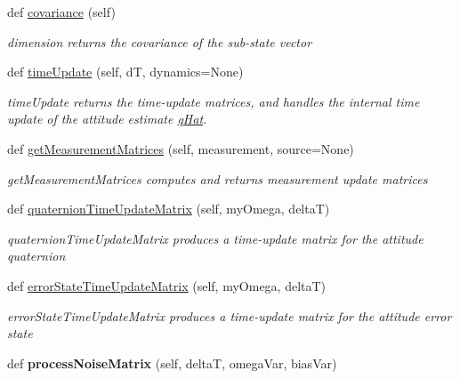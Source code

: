 \begin{DoxyCompactItemize}
def \hyperlink{classAttitudeSubstate_1_1AttitudeState6DOF_a44691ece9ee2a36d3c11f12e72004e41}{covariance} (self)
\begin{DoxyCompactList}\small\item\em dimension returns the covariance of the sub-\/state vector \end{DoxyCompactList}\item 
def \hyperlink{classAttitudeSubstate_1_1AttitudeState6DOF_a9b27c2b6d9e51256918edd8505df0bd7}{time\+Update} (self, dT, dynamics=None)
\begin{DoxyCompactList}\small\item\em time\+Update returns the time-\/update matrices, and handles the internal time update of the attitude estimate \hyperlink{classAttitudeSubstate_1_1AttitudeState6DOF_a36a58a47280151dd544762d9a1d5c35d}{q\+Hat}. \end{DoxyCompactList}\item 
def \hyperlink{classAttitudeSubstate_1_1AttitudeState6DOF_a81f4c417a0f6f0ecf0478fc885bbd79f}{get\+Measurement\+Matrices} (self, measurement, source=None)
\begin{DoxyCompactList}\small\item\em get\+Measurement\+Matrices computes and returns measurement update matrices \end{DoxyCompactList}\item 
def \hyperlink{classAttitudeSubstate_1_1AttitudeState6DOF_aada43a81dfe3ae7b1a22dd24220062e8}{quaternion\+Time\+Update\+Matrix} (self, my\+Omega, deltaT)
\begin{DoxyCompactList}\small\item\em quaternion\+Time\+Update\+Matrix produces a time-\/update matrix for the attitude quaternion \end{DoxyCompactList}\item 
def \hyperlink{classAttitudeSubstate_1_1AttitudeState6DOF_a98463a04f2b7f78389d7cce944139afd}{error\+State\+Time\+Update\+Matrix} (self, my\+Omega, deltaT)
\begin{DoxyCompactList}\small\item\em error\+State\+Time\+Update\+Matrix produces a time-\/update matrix for the attitude error state \end{DoxyCompactList}\item 
def {\bfseries process\+Noise\+Matrix} (self, deltaT, omega\+Var, bias\+Var)\hypertarget{classAttitudeSubstate_1_1AttitudeState6DOF_abc5b2c8345bcd948d35b438fce184dee}{}\label{classAttitudeSubstate_1_1AttitudeState6DOF_abc5b2c8345bcd948d35b438fce184dee}


\end{DoxyCompactItemize}

